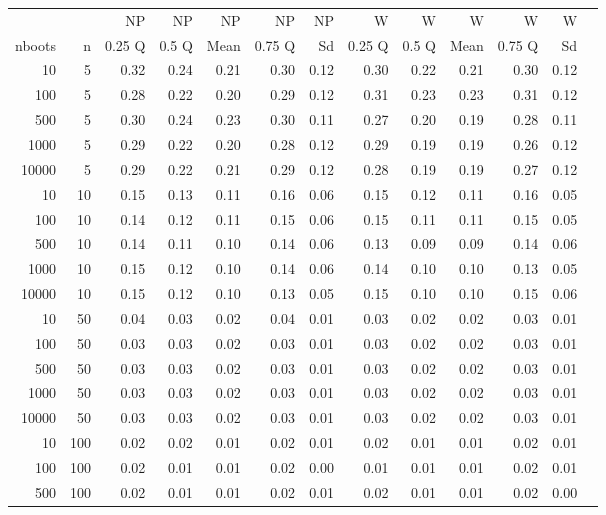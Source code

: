 \begin{table}[ht]
\footnotesize
\centering
\begin{tabular}{rrrrrrrrrrrrr}
  \hline
  & & NP & NP & NP & NP & NP & W & W & W & W & W \\
nboots & n & 0.25 Q & 0.5 Q & Mean & 0.75 Q & Sd & 0.25 Q & 0.5 Q & Mean & 0.75 Q & Sd \\ 
  \hline
10 & 5 & 0.32 & 0.24 & 0.21 & 0.30 & 0.12 & 0.30 & 0.22 & 0.21 & 0.30 & 0.12 \\ 
100 & 5 & 0.28 & 0.22 & 0.20 & 0.29 & 0.12 & 0.31 & 0.23 & 0.23 & 0.31 & 0.12 \\ 
 500 & 5 & 0.30 & 0.24 & 0.23 & 0.30 & 0.11 & 0.27 & 0.20 & 0.19 & 0.28 & 0.11 \\ 
 1000 & 5 & 0.29 & 0.22 & 0.20 & 0.28 & 0.12 & 0.29 & 0.19 & 0.19 & 0.26 & 0.12 \\ 
 10000 & 5 & 0.29 & 0.22 & 0.21 & 0.29 & 0.12 & 0.28 & 0.19 & 0.19 & 0.27 & 0.12 \\ 
  10 & 10 & 0.15 & 0.13 & 0.11 & 0.16 & 0.06 & 0.15 & 0.12 & 0.11 & 0.16 & 0.05 \\ 
 100 & 10 & 0.14 & 0.12 & 0.11 & 0.15 & 0.06 & 0.15 & 0.11 & 0.11 & 0.15 & 0.05 \\ 
 500 & 10 & 0.14 & 0.11 & 0.10 & 0.14 & 0.06 & 0.13 & 0.09 & 0.09 & 0.14 & 0.06 \\ 
 1000 & 10 & 0.15 & 0.12 & 0.10 & 0.14 & 0.06 & 0.14 & 0.10 & 0.10 & 0.13 & 0.05 \\ 
 10000 & 10 & 0.15 & 0.12 & 0.10 & 0.13 & 0.05 & 0.15 & 0.10 & 0.10 & 0.15 & 0.06 \\ 
 10 & 50 & 0.04 & 0.03 & 0.02 & 0.04 & 0.01 & 0.03 & 0.02 & 0.02 & 0.03 & 0.01 \\ 
 100 & 50 & 0.03 & 0.03 & 0.02 & 0.03 & 0.01 & 0.03 & 0.02 & 0.02 & 0.03 & 0.01 \\ 
  500 & 50 & 0.03 & 0.03 & 0.02 & 0.03 & 0.01 & 0.03 & 0.02 & 0.02 & 0.03 & 0.01 \\ 
 1000 & 50 & 0.03 & 0.03 & 0.02 & 0.03 & 0.01 & 0.03 & 0.02 & 0.02 & 0.03 & 0.01 \\ 
 10000 & 50 & 0.03 & 0.03 & 0.02 & 0.03 & 0.01 & 0.03 & 0.02 & 0.02 & 0.03 & 0.01 \\ 
 10 & 100 & 0.02 & 0.02 & 0.01 & 0.02 & 0.01 & 0.02 & 0.01 & 0.01 & 0.02 & 0.01 \\ 
 100 & 100 & 0.02 & 0.01 & 0.01 & 0.02 & 0.00 & 0.01 & 0.01 & 0.01 & 0.02 & 0.01 \\ 
 500 & 100 & 0.02 & 0.01 & 0.01 & 0.02 & 0.01 & 0.02 & 0.01 & 0.01 & 0.02 & 0.00 \\ 

\end{tabular}
\end{table}
